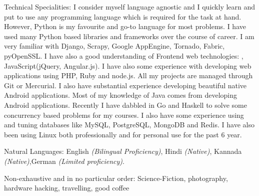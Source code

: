 \documentclass[10pt,a4paper]{article}
\begin{document}
{
}

\spacedhrule{0.5em}{-0.4em}


\inlineheadsection  %
  {Technical Specialities:}
  {I consider myself language agnostic and I quickly learn and put to use any programming language which is required for the task at hand. However, Python is my favourite and go-to language for most problems. I have used many Python based libraries and frameworks over the course of career. I am very familiar with Django, Scrapy, Google AppEngine, Tornado, Fabric, pyOpenSSL. I have also a good understanding of Frontend web technologies: , JavaScript(jQuery, Angular.js). I have also some experience with developing web applications using PHP, Ruby and node.js. All my projects are managed through Git or Mercurial. I also have substantial experience developing beautiful native Android applications. Most of my knowledge of Java comes from developing Android applications. Recently I have dabbled in Go and Haskell to solve some concurrency based problems for my courses. I also have some experience using and tuning databases like MySQL, PostgreSQL, MongoDB and Redis. I have also been using Linux both professionally and for personal use for the past 6 year.
}

\inlineheadsection
  {Natural Languages:}
  {English \emph{(Bilingual Proficiency)}, Hindi \emph{(Native)}, Kannada \emph{(Native)},German \emph{(Limited proficiency)}.}


\spacedhrule{1.6em}{-0.4em}


\inlineheadsection
  {Non-exhaustive and in no particular order:}
  {Science-Fiction, photography, hardware hacking, travelling, good coffee}
\end{document}
